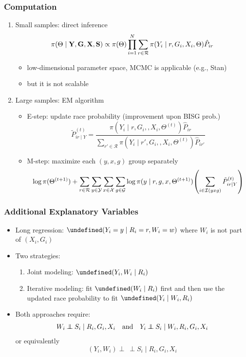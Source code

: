 \documentclass{beamer}
\let\Pr\undefined
\DeclareMathOperator{\Pr}{\mathbb{P}}
\newcommand{\indep}{\mathbin{\perp\!\!\!\!\!\:\perp}}
\newcommand{\cR}{\mathcal{R}}
\newcommand{\cG}{\mathcal{G}}
\newcommand{\cX}{\mathcal{X}}
\newcommand{\cY}{\mathcal{Y}}
\newcommand{\cI}{\mathcal{I}}
\begin{document}
\begin{frame}

  \frametitle{Computation}

  \begin{enumerate}
  \item Small samples: \alert{direct inference}
$$
    \pi(\Theta\mid \vb Y, \vb G, \vb X, \vb S)
    \propto \pi(\Theta) \prod_{i=1}^N \sum_{r\in\cR} \pi(Y_i\mid 
    r, G_i, X_i, \Theta)\hat{P}_{ir}
    $$
    \begin{itemize}
    \item low-dimensional parameter space, MCMC is applicable (e.g.,
      Stan)
    \item but it is not scalable
    \end{itemize}
    
  \item Large samples: \alert{EM algorithm}
    \begin{itemize}
    \item E-step: update race probability (improvement upon BISG prob.)
      $$\tilde{P}_{ir\mid Y}^{(t)}
    = \frac{\pi(Y_i\mid r, G_i,, X_i, \Theta^{(t)}) \hat P_{ir}}{
        \sum_{r'\in\cR} \pi(Y_i\mid r', G_i,, X_i, \Theta^{(t)}) \hat P_{ir'} }$$
    \item M-step: maximize each $(y,x,g)$ group separately
      $$\log \pi(\Theta^{(t+1)}) + \sum_{r\in\cR}\sum_{y\in\cY}\sum_{x\in\cX}\sum_{g\in\cG} 
        \log \pi(y\mid r, g, x, \Theta^{(t+1)}) 
        \qty(\sum_{i\in\cI(yxg)} \tilde{P}_{ir\mid Y}^{(t)}) $$
    \end{itemize}

  \end{enumerate}

\end{frame}

\begin{frame}

  \frametitle{Additional Explanatory Variables}

  \begin{itemize}
  \item Long regression: $\Pr(Y_i  = y \mid R_i = r, W_i = w)$ where
    $W_i$ is not part of $(X_i, G_i)$
\vfill
  \item Two strategies:
    \begin{enumerate}
    \item Joint modeling: $\Pr(Y_i, W_i \mid R_i)$
    \item Iterative modeling: fit $\Pr(W_i \mid R_i)$ first and then use the
      updated race probability to fit $\Pr(Y_i \mid W_i, R_i)$
    \end{enumerate}
\vfill
\item Both approaches require:
   $$W_i\indep S_i\mid R_i,G_i,X_i \qand
   Y_i\indep S_i\mid W_i,R_i,G_i,X_i$$
   or equivalently
   $$(Y_i, W_i)\indep S_i\mid R_i,G_i,X_i$$
   \vspace{-.4in}
  \end{itemize}

\end{frame}
\end{document}
